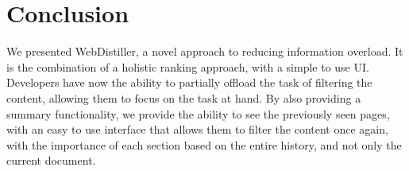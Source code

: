 \section{Conclusion}\label{sec:conclusion}
We presented WebDistiller, a novel approach to reducing information overload. It is the combination of a holistic ranking approach, with a simple to use UI. Developers have now the ability to partially offload the task of filtering the content, allowing them to focus on the task at hand. By also providing a summary functionality, we provide the ability to see the previously seen pages, with an easy to use interface that allows them to filter the content once again, with the importance of each section based on the entire history, and not only the current document. 